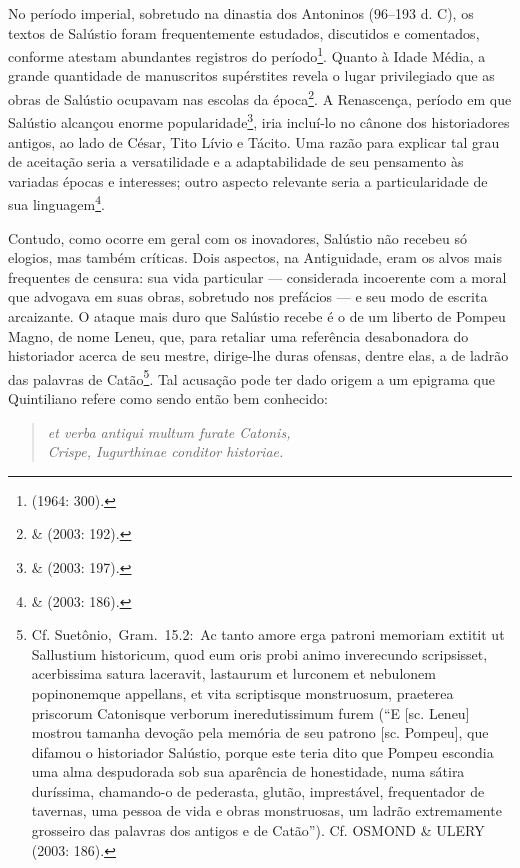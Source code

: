 No período imperial, sobretudo na dinastia dos Antoninos (96--193 d. C), os
textos de Salústio foram frequentemente estudados, discutidos e comentados,
conforme atestam abundantes registros do período\footnote{ (1964: 300).}.
Quanto à Idade Média, a grande quantidade de manuscritos supérstites revela o
lugar privilegiado que as obras de Salústio ocupavam nas escolas da
época\footnote{ \&  (2003: 192).}. A Renascença, período em que
Salústio alcançou enorme popularidade\footnote{ \&  (2003: 197).},
iria incluí-lo no cânone dos historiadores antigos, ao lado de César, Tito
Lívio e Tácito. Uma razão para explicar tal grau de aceitação seria a
versatilidade e a adaptabilidade de seu pensamento às variadas épocas e
interesses; outro aspecto relevante seria a particularidade de sua
linguagem\footnote{  \&  (2003: 186).}. 

Contudo, como ocorre em geral com os inovadores, Salústio não recebeu só
elogios, mas também críticas. Dois aspectos, na Antiguidade, eram os alvos mais
frequentes de censura: sua vida particular --- considerada incoerente com a
moral que advogava em suas obras, sobretudo nos prefácios --- e seu modo de 
escrita arcaizante.  O ataque mais duro que Salústio recebe é o de um liberto
de Pompeu Magno, de nome Leneu, que, para retaliar uma referência desabonadora
do historiador acerca de seu mestre, dirige-lhe duras ofensas, dentre elas, a
de ladrão das palavras de Catão\footnote{Cf. Suetônio, Gram. 15.2: Ac tanto amore erga patroni memoriam extitit ut Sallustium historicum, quod eum oris probi animo inverecundo scripsisset, acerbissima satura laceravit, lastaurum et lurconem et nebulonem popinonemque appellans, et vita scriptisque monstruosum, praeterea priscorum Catonisque verborum ineredutissimum furem
(“E [sc. Leneu] mostrou tamanha devoção pela memória de seu patrono [sc. Pompeu], que difamou o historiador Salústio, porque este teria dito que Pompeu escondia uma alma despudorada sob sua aparência de honestidade, numa sátira duríssima, chamando-o de pederasta, glutão, imprestável, frequentador de tavernas, uma pessoa de vida e obras monstruosas, um ladrão extremamente grosseiro das palavras dos antigos e de Catão”). Cf. OSMOND & ULERY (2003: 186).}. Tal acusação pode ter dado origem a um epigrama que
Quintiliano refere como sendo então bem conhecido: 

\begin{verse}
\emph{et verba antiqui
multum furate Catonis,\\ Crispe, Iugurthinae conditor historiae.} 

\end{verse}
 


